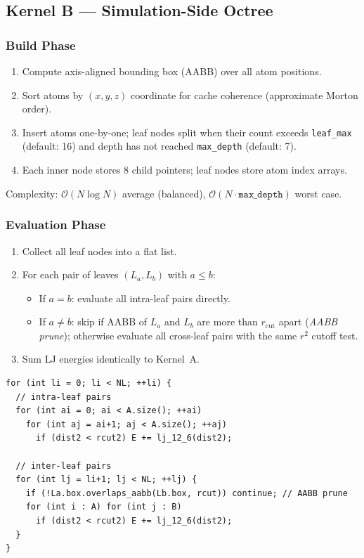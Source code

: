 \documentclass[11pt,a4paper]{article}
\theoremstyle{definition}
\theoremstyle{plain}
\newcommand{\OnlogN}{\mathcal{O}(N \log N)}
\newcommand{\rcut}{r_{\mathrm{cut}}}
\begin{document}
\subsection{Kernel B — Simulation-Side Octree}
\label{sec:octree}

\subsubsection{Build Phase}

\begin{enumerate}
  \item Compute axis-aligned bounding box (AABB) over all atom positions.
  \item Sort atoms by $(x, y, z)$ coordinate for cache coherence
	(approximate Morton order).
  \item Insert atoms one-by-one; leaf nodes split when their count exceeds
	\texttt{leaf\_max} (default: 16) and depth has not reached
	\texttt{max\_depth} (default: 7).
  \item Each inner node stores 8 child pointers; leaf nodes store atom
	index arrays.
\end{enumerate}

Complexity: $\OnlogN$ average (balanced), $\mathcal{O}(N \cdot \texttt{max\_depth})$
worst case.

\subsubsection{Evaluation Phase}

\begin{enumerate}
  \item Collect all leaf nodes into a flat list.
  \item For each pair of leaves $(L_a, L_b)$ with $a \leq b$:
	\begin{itemize}
	  \item If $a = b$: evaluate all intra-leaf pairs directly.
	  \item If $a \neq b$: skip if AABB of $L_a$ and $L_b$ are more than
		$\rcut$ apart (\emph{AABB prune}); otherwise evaluate all cross-leaf
		pairs with the same $r^2$ cutoff test.
	\end{itemize}
  \item Sum LJ energies identically to Kernel~A.
\end{enumerate}

\begin{lstlisting}
for (int li = 0; li < NL; ++li) {
  // intra-leaf pairs
  for (int ai = 0; ai < A.size(); ++ai)
	for (int aj = ai+1; aj < A.size(); ++aj)
	  if (dist2 < rcut2) E += lj_12_6(dist2);

  // inter-leaf pairs
  for (int lj = li+1; lj < NL; ++lj) {
	if (!La.box.overlaps_aabb(Lb.box, rcut)) continue; // AABB prune
	for (int i : A) for (int j : B)
	  if (dist2 < rcut2) E += lj_12_6(dist2);
  }
}
\end{lstlisting}
\end{document}
